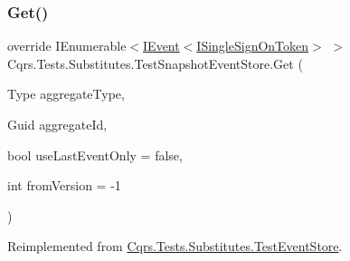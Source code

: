 \subsubsection{\texorpdfstring{Get()}{Get()}}
{\footnotesize\ttfamily override I\+Enumerable$<$\hyperlink{interfaceCqrs_1_1Events_1_1IEvent}{I\+Event}$<$\hyperlink{interfaceCqrs_1_1Authentication_1_1ISingleSignOnToken}{I\+Single\+Sign\+On\+Token}$>$ $>$ Cqrs.\+Tests.\+Substitutes.\+Test\+Snapshot\+Event\+Store.\+Get (\begin{DoxyParamCaption}\item[{Type}]{aggregate\+Type,  }\item[{Guid}]{aggregate\+Id,  }\item[{bool}]{use\+Last\+Event\+Only = {\ttfamily false},  }\item[{int}]{from\+Version = {\ttfamily -\/1} }\end{DoxyParamCaption})\hspace{0.3cm}{\ttfamily [virtual]}}



Reimplemented from \hyperlink{classCqrs_1_1Tests_1_1Substitutes_1_1TestEventStore_a58e89fab7fdfafff88c62317b6765e55_a58e89fab7fdfafff88c62317b6765e55}{Cqrs.\+Tests.\+Substitutes.\+Test\+Event\+Store}.

